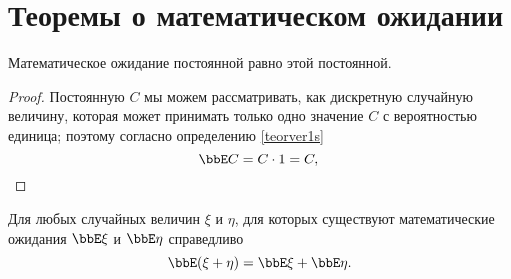 \section{Теоремы о математическом ожидании}
\begin{thm}\label{ch31.3thm1}
Математическое ожидание постоянной равно этой постоянной.
\end{thm}
\begin{proof}
Постоянную $C$ мы можем рассматривать, как дискретную случайную величину, которая может принимать только одно значение $C$ с вероятностью единица; поэтому согласно определению \ref{teorver1s}
\begin{equation*}
\bbE C = C\cdot1=C, \qedhere
\end{equation*}
\end{proof}
\begin{thm}\label{ch31.2t1}
Для любых случайных величин $\xi$ и $\eta$, для которых существуют математические ожидания $\bbE\xi$ и $\bbE\eta$ справедливо\footnotemark
\begin{equation}
\bbE(\xi+\eta) = \bbE\xi+\bbE\eta.
\end{equation}
\end{thm}
